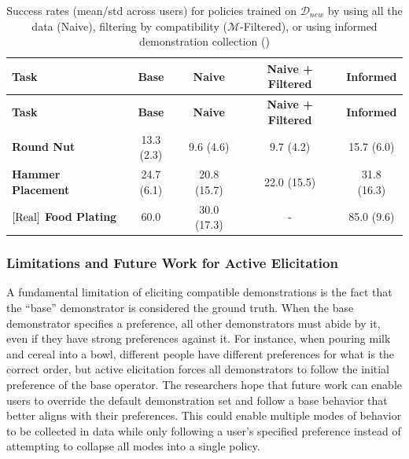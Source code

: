 \documentclass[
  letterpaper,
  numbers=noenddot,
  DIV=11]{scrreprt}
\theoremstyle{definition}
\theoremstyle{plain}
\theoremstyle{plain}
\theoremstyle{remark}
\begin{document}
\begin{longtable}[]{@{}lcccc@{}}
\caption{Success rates (mean/std across users) for policies trained on
\(\mathcal{D}_{new}\) by using all the data (Naive), filtering by
compatibility (\(\mathcal{M}\)-Filtered), or using informed
demonstration collection ()}\label{tbl-active_elicitation_results}\tabularnewline
\toprule\noalign{}
\textbf{Task} & \textbf{Base} & \textbf{Naive} & \textbf{Naive +
Filtered} & \textbf{Informed} \\
\midrule\noalign{}
\endfirsthead
\toprule\noalign{}
\textbf{Task} & \textbf{Base} & \textbf{Naive} & \textbf{Naive +
Filtered} & \textbf{Informed} \\
\midrule\noalign{}
\endhead
\bottomrule\noalign{}
\endlastfoot
\textbf{Round Nut} & 13.3 (2.3) & 9.6 (4.6) & 9.7 (4.2) & 15.7 (6.0) \\
\textbf{Hammer Placement} & 24.7 (6.1) & 20.8 (15.7) & 22.0 (15.5) &
31.8 (16.3) \\
\textbf{\(\left[ \textup{Real} \right]\) Food Plating} & 60.0 & 30.0
(17.3) & - & 85.0 (9.6) \\
\end{longtable}

\subsubsection*{Limitations and Future Work for Active
Elicitation}\label{limitations-and-future-work-for-active-elicitation}

A fundamental limitation of eliciting compatible demonstrations is the
fact that the ``base'' demonstrator is considered the ground truth. When
the base demonstrator specifies a preference, all other demonstrators
must abide by it, even if they have strong preferences against it. For
instance, when pouring milk and cereal into a bowl, different people
have different preferences for what is the correct order, but active
elicitation forces all demonstrators to follow the initial preference of
the base operator. The researchers hope that future work can enable
users to override the default demonstration set and follow a base
behavior that better aligns with their preferences. This could enable
multiple modes of behavior to be collected in data while only following
a user's specified preference instead of attempting to collapse all
modes into a single policy.
\end{document}

